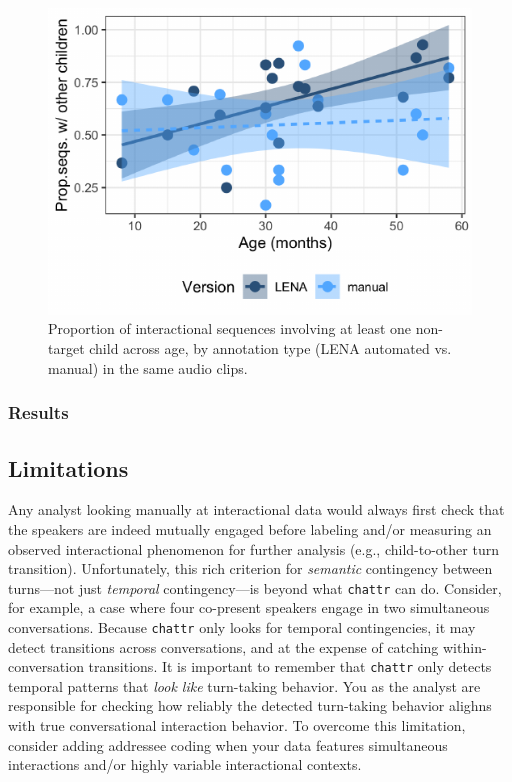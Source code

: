 \documentclass[10pt, letterpaper]{article}
\newenvironment{CodeChunk}{}{}
\begin{document}
\begin{CodeChunk}
\begin{figure}[h]

{\centering \includegraphics{figs/tsi.is.fig-1} 

}

\caption[Proportion of interactional sequences involving at least one non-target child across age, by annotation type (LENA automated vs]{Proportion of interactional sequences involving at least one non-target child across age, by annotation type (LENA automated vs. manual) in the same audio clips.}\label{fig:tsi.is.fig}
\end{figure}
\end{CodeChunk}

\hypertarget{results-1}{%
\subsubsection{Results}\label{results-1}}

\hypertarget{limitations}{%
\subsection{Limitations}\label{limitations}}

Any analyst looking manually at interactional data would always first
check that the speakers are indeed mutually engaged before labeling
and/or measuring an observed interactional phenomenon for further
analysis (e.g., child-to-other turn transition). Unfortunately, this
rich criterion for \emph{semantic} contingency between turns---not just
\emph{temporal} contingency---is beyond what \texttt{chattr} can do.
Consider, for example, a case where four co-present speakers engage in
two simultaneous conversations. Because \texttt{chattr} only looks for
temporal contingencies, it may detect transitions across conversations,
and at the expense of catching within-conversation transitions. It is
important to remember that \texttt{chattr} only detects temporal
patterns that \emph{look like} turn-taking behavior. You as the analyst
are responsible for checking how reliably the detected turn-taking
behavior alighns with true conversational interaction behavior. To
overcome this limitation, consider adding addressee coding when your
data features simultaneous interactions and/or highly variable
interactional contexts.
\end{document}
